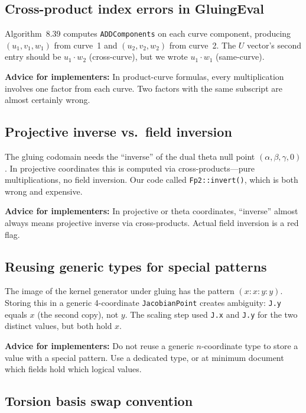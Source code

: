 \subsection{Cross-product index errors in GluingEval}
\label{sec:bug-gluing-eval}

Algorithm~8.39 computes \texttt{ADDComponents} on each curve
component, producing $(u_1, v_1, w_1)$ from curve~1 and
$(u_2, v_2, w_2)$ from curve~2.  The $U$ vector's second entry
should be $u_1 \cdot w_2$ (cross-curve), but we wrote $u_1 \cdot w_1$
(same-curve).

\noindent
\textbf{Advice for implementers:} In product-curve formulas, every multiplication
involves one factor from each curve.  Two factors with the same
subscript are almost certainly wrong.

\subsection{Projective inverse vs.\ field inversion}
\label{sec:bug-projective-inverse}

The gluing codomain needs the ``inverse'' of the dual theta null point
$(\alpha, \beta, \gamma, 0)$.  In projective coordinates this is
computed via cross-products---pure multiplications, no field inversion.
Our code called \texttt{Fp2::invert()}, which is both wrong and
expensive.

\noindent
\textbf{Advice for implementers:} In projective or theta coordinates, ``inverse''
almost always means projective inverse via cross-products.  Actual
field inversion is a red flag.

\subsection{Reusing generic types for special patterns}
\label{sec:bug-imageK}

The image of the kernel generator under gluing has the pattern
$(x : x : y : y)$.  Storing this in a generic 4-coordinate
\texttt{JacobianPoint} creates ambiguity: \texttt{J.y} equals $x$
(the second copy), not $y$.  The scaling step used \texttt{J.x}
and \texttt{J.y} for the two distinct values, but both hold $x$.

\noindent
\textbf{Advice for implementers:} Do not reuse a generic $n$-coordinate type to store
a value with a special pattern.  Use a dedicated type, or at minimum
document which fields hold which logical values.

\subsection{Torsion basis swap convention}
\label{sec:from-hint}

